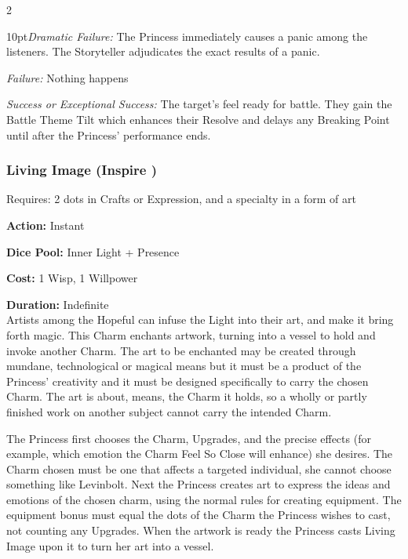 \begin{multicols}{2}
\begin{myindentpar}{10pt}\emph{Dramatic Failure:} The Princess immediately causes a panic among the listeners. The Storyteller adjudicates the exact results of a panic. 
 
 \emph{Failure:} Nothing happens
 
 \emph{Success or Exceptional Success:} The target's feel ready for battle. They gain the Battle Theme Tilt which enhances their Resolve and delays any Breaking Point until after the Princess' performance ends.  
 
 \end{myindentpar}

\subsubsection*{Living Image (Inspire \textbullet)}

\noindent Requires: 2 dots in Crafts or Expression, and a specialty in a form of art

\noindent \textbf{Action:} Instant

\noindent \textbf{Dice Pool:} Inner Light + Presence 

\noindent \textbf{Cost:} 1 Wisp, 1 Willpower

\noindent \textbf{Duration:} Indefinite\\

\noindent Artists among the Hopeful can infuse the Light into their art, and make it bring forth magic. This Charm enchants artwork, turning into a vessel to hold and invoke another Charm. The art to be enchanted may be created through mundane, technological or magical means but it must be a product of the Princess' creativity and it must be designed specifically to carry the chosen Charm. The art is about, means, the Charm it holds, so a wholly or partly finished work on another subject cannot carry the intended Charm.

The Princess first chooses the Charm, Upgrades, and  the precise effects (for example, which emotion the Charm Feel So Close will enhance) she desires. The Charm chosen must be one that affects a targeted individual, she cannot choose something like Levinbolt. Next the Princess creates art to express the ideas and emotions of the chosen charm, using the normal rules for creating equipment. The equipment bonus must equal the dots of the Charm the Princess wishes to cast, not counting any Upgrades. When the artwork is ready the Princess casts Living Image upon it to turn her art into a vessel. 



\end{multicols}

